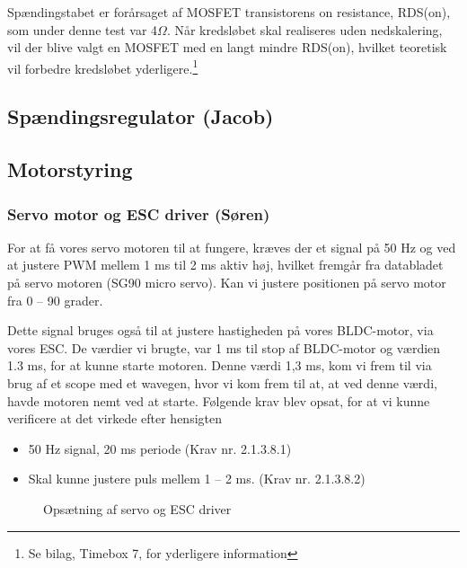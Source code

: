 Spændingstabet er forårsaget af MOSFET transistorens on resistance, RDS(on), som under denne test var 4$\Omega$. Når kredsløbet skal realiseres uden nedskalering, vil der blive valgt en MOSFET med en langt mindre RDS(on), hvilket teoretisk vil forbedre kredsløbet yderligere.\footnote{Se bilag, Timebox 7, for yderligere information}

\subsection{Spændingsregulator (Jacob)}
\label{sec:spand-jacob}


\subsection{Motorstyring}
\label{sec:motorstyring-1}

\subsubsection{Servo motor og ESC driver (Søren)}
\label{sec:servo-motor-og}

For at få vores servo motoren til at fungere, kræves der et signal på 50 Hz og ved at justere PWM mellem 1 ms til 2 ms aktiv høj, hvilket fremgår fra databladet på servo motoren (SG90 micro servo). Kan vi justere positionen på servo motor fra 0 – 90 grader.

Dette signal bruges også til at justere hastigheden på vores BLDC-motor, via vores ESC. De værdier vi brugte, var 1 ms til stop af BLDC-motor og værdien 1.3 ms, for at kunne starte motoren. Denne værdi 1,3 ms, kom vi frem til via brug af et scope med et wavegen, hvor vi kom frem til at, at ved denne værdi, havde motoren nemt ved at starte. Følgende krav blev opsat, for at vi kunne verificere at det virkede efter hensigten    

\begin{itemize}
\item 50 Hz signal, 20 ms periode (Krav nr. 2.1.3.8.1)
\item Skal kunne justere puls mellem 1 – 2 ms. (Krav nr. 2.1.3.8.2)
\end{itemize}
\clearpage
\begin{figure}[h]
  \centering
    
  \caption{Opsætning af servo og ESC driver}
  \label{fig:kodes1}
\end{figure}

